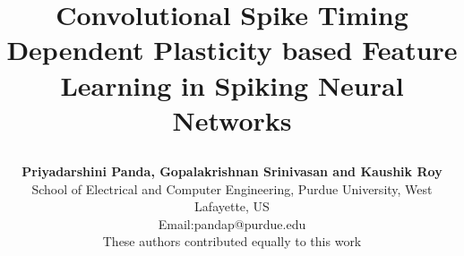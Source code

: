 \documentclass[journal, onecolumn]{IEEEtran}
\begin{document}
%
\title{
\begin{flushleft}
Convolutional Spike Timing Dependent Plasticity based Feature Learning in Spiking Neural Networks
\end{flushleft}
}

\author{\begin{flushleft}
\textbf{Priyadarshini Panda, Gopalakrishnan Srinivasan and Kaushik Roy}\\
School of Electrical and Computer Engineering, Purdue University, West Lafayette, US\\
Email:pandap@purdue.edu\\
These authors contributed equally to this work
\end{flushleft}

\vspace{-2.0ex}
}


%
\end{document}
